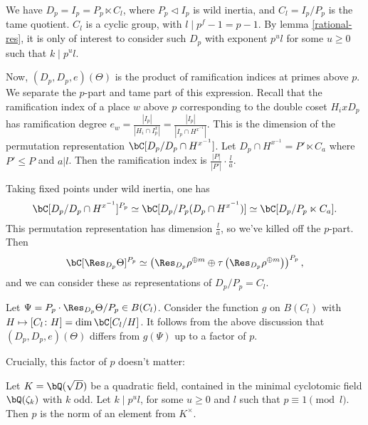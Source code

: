 We have $D_p = I_p = P_p \ltimes C_l$, where $P_p \triangleleft I_p$ is wild inertia, and $C_l = I_p / P_p$ is the tame quotient. $C_l$ is a cyclic group, with $l \mid p^f - 1 = p - 1$. By lemma \ref{rational-res}, it is only of interest to consider such $D_p$ with exponent  $p^u l$ for some $u \geq 0$ such that $k \mid p^u l$.

Now, $(D_p, D_p, e)(\Theta)$ is the product of ramification indices at primes above $p$. We separate the $p$-part and tame part of this expression.
Recall that the ramification index of a place $w$ above $p$ corresponding to the double coset $H_i x D_p$ has ramification degree $e_w = \frac{|I_p|}{|H_i \cap I_p^x|} =\frac{|I_p|}{|I_p \cap H^{x^{-1}}|}$.
This is the dimension of the permutation representation $\bC[D_p / D_p \cap H^{x^{-1}}]$.
Let  $D_p \cap H^{x^{-1}} = P' \ltimes C_a$ where $P' \leq P$ and $a | l$. Then the ramification index is $\frac{|P|}{|P'|}\cdot \frac{l}{a}$. 

Taking fixed points under wild inertia, one has $$\bC[D_p / D_p \cap H^{x^{-1}}]^{P_p} \simeq \bC[D_p / P_p (D_p \cap H^{x^{-1}})] \simeq \bC[D_p / P_p \ltimes C_a].$$ This permutation representation has dimension $\frac{l}{a}$, so we've killed off the $p$-part. 
Then $$\bC[\Res_{D_p} \Theta]^{P_p} \simeq \left(\Res_{D_p} \rho^{\oplus m} \oplus \tau\left(\Res_{D_p}\rho^{\oplus m}\right)\right)^{P_p},$$
and we can consider these as representations of $D_p / P_p = C_l$.

Let $\Psi = P_p \cdot \Res_{D_p}\Theta / P_p \in B(C_l)$.
Consider the function $g$ on $B(C_l)$ with $H \mapsto [C_l \colon H] = \dim \bC[C_l / H]$. 
It follows from the above discussion that $(D_p, D_p, e)(\Theta)$ differs from $g(\Psi)$ up to a factor of $p$. 


Crucially, this factor of $p$ doesn't matter:

\begin{lemma}
    Let $K = \bQ(\sqrt{D})$ be a quadratic field, contained in the minimal cyclotomic field $\bQ(\zeta_k)$ with $k$ odd. Let $k \mid p^u l $, for some $u \geq 0$ and $l$ such that $p \equiv 1 \pmod l$. Then $p$ is the norm of an element from $K^{\times}$.
\end{lemma}

